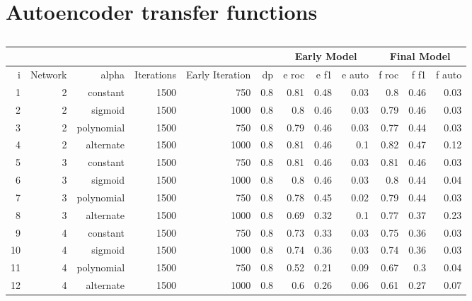   \section{Autoencoder transfer functions}
    \begin{table}[!h] { \small \centering
      \begin{tabular}{rrrrrrrrrrrr}
        &&&&& &  \multicolumn{3}{|c|}{Early Model} &  \multicolumn{3}{c|}{Final Model}    \\
        \hline
         i & Network                 & alpha    &   Iterations &   Early Iteration &   dp &   e roc &   e f1 &   e auto &   f roc &   f f1 &   f auto \\
         \hline
         1 & 2 & constant & 1500 &   750 &  0.8 &    0.81 &   0.48 &     0.03 &    0.8  &   0.46 &     0.03 \\
         2 & 2 & sigmoid  & 1500 &  1000 &  0.8 &    0.8  &   0.46 &     0.03 &    0.79 &   0.46 &     0.03 \\
         3 & 2 & polynomial     & 1500 &   750 &  0.8 &    0.79 &   0.46 &     0.03 &    0.77 &   0.44 &     0.03 \\
         4 & 2 & alternate     & 1500 &  1000 &  0.8 &    0.81 &   0.46 &     0.1  &    0.82 &   0.47 &     0.12 \\
         \hline
         5 & 3 & constant & 1500 &   750 &  0.8 &    0.81 &   0.46 &     0.03 &    0.81 &   0.46 &     0.03 \\
         6 & 3 & sigmoid  & 1500 &  1000 &  0.8 &    0.8  &   0.46 &     0.03 &    0.8  &   0.44 &     0.04 \\
         7 & 3 & polynomial     & 1500 &   750 &  0.8 &    0.78 &   0.45 &     0.02 &    0.79 &   0.44 &     0.03 \\
         8 & 3 & alternate     & 1500 &  1000 &  0.8 &    0.69 &   0.32 &     0.1  &    0.77 &   0.37 &     0.23 \\
         \hline
         9 & 4 & constant & 1500 &   750 &  0.8 &    0.73 &   0.33 &     0.03 &    0.75 &   0.36 &     0.03 \\
        10 & 4 & sigmoid  & 1500 &  1000 &  0.8 &    0.74 &   0.36 &     0.03 &    0.74 &   0.36 &     0.03 \\
        11 & 4 & polynomial     & 1500 &   750 &  0.8 &    0.52 &   0.21 &     0.09 &    0.67 &   0.3  &     0.04 \\
        12 & 4 & alternate     & 1500 &  1000 &  0.8 &    0.6  &   0.26 &     0.06 &    0.61 &   0.27 &     0.07 \\
      \hline
      \end{tabular}  } \caption{} \label{tab:pseaafasfrch} \end{table}


